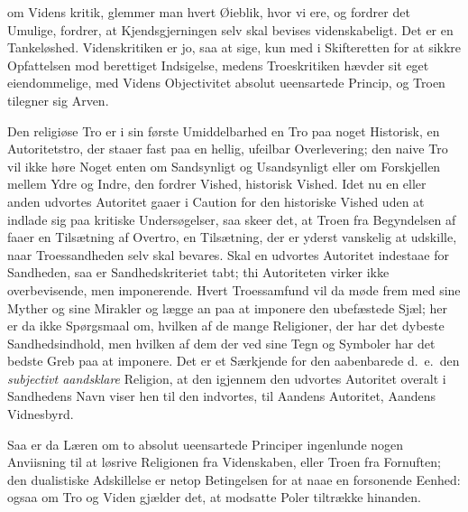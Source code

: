 \documentclass[12pt]{article}
\newcommand{\opage}[1]{\marginnote{\footnotesize\textit{[#1]}}}
\begin{document}
om Videns%
\opage{76}kritik, glemmer man hvert Øieblik, hvor vi ere, og fordrer det Umulige,
fordrer, at Kjendsgjerningen selv skal bevises videnskabeligt. Det er
en Tankeløshed. Videnskritiken er jo, saa at sige, kun med i
Skifteretten for at sikkre Opfattelsen mod berettiget Indsigelse,
medens Troeskritiken hævder sit eget eiendommelige, med Videns
Objectivitet absolut ueensartede Princip, og Troen tilegner sig Arven.

Den religiøse Tro er i sin første Umiddelbarhed en Tro paa noget
Historisk, en Autoritetstro, der staaer fast paa en hellig, ufeilbar
Overlevering; den naive Tro vil ikke høre Noget enten om Sandsynligt og
Usandsynligt eller om Forskjellen mellem Ydre og Indre, den fordrer
Vished, historisk Vished. Idet nu en eller anden udvortes Autoritet
gaaer i Caution for den historiske Vished uden at indlade sig paa
kritiske Undersøgelser, saa skeer det, at Troen fra Begyndelsen af
faaer en Tilsætning af Overtro, en Tilsætning, der er yderst vanskelig
at udskille, naar Troessandheden selv skal bevares. Skal en udvortes
Autoritet indestaae for Sandheden, saa er Sandhedskriteriet tabt; thi
Autoriteten virker ikke overbevisende, men imponerende. Hvert
Troessamfund vil da møde frem med sine Myther og sine Mirakler og lægge
an paa at imponere den ubefæstede Sjæl; her er da ikke Spørgsmaal om,
hvilken af de
\opage{77} mange Religioner, der har det dybeste Sandhedsindhold, men hvilken af
dem der ved sine Tegn og Symboler har det bedste Greb paa at imponere.
Det er et Særkjende for den aabenbarede d.\ e.\ den \emph{subjectivt
aandsklare} Religion, at den igjennem den udvortes Autoritet overalt i
Sandhedens Navn viser hen til den indvortes, til Aandens Autoritet,
Aandens Vidnesbyrd.

Saa er da Læren om to absolut ueensartede Principer ingenlunde nogen
Anviisning til at løsrive Religionen fra Videnskaben, eller Troen fra
Fornuften; den dualistiske Adskillelse er netop Betingelsen for at naae
en forsonende Eenhed: ogsaa om Tro og Viden gjælder det, at modsatte
Poler tiltrække hinanden.
\end{document}
